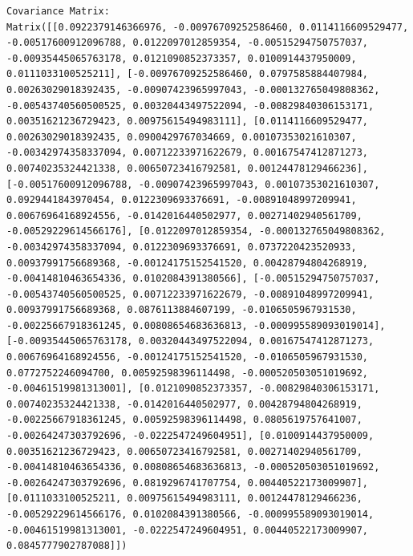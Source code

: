 \documentclass[
  letterpaper,
  DIV=11,
  numbers=noendperiod]{scrreprt}
\theoremstyle{plain}
\theoremstyle{definition}
\theoremstyle{remark}
\begin{document}
\begin{verbatim}
Covariance Matrix:
Matrix([[0.0922379146366976, -0.00976709252586460, 0.0114116609529477, -0.00517600912096788, 0.0122097012859354, -0.00515294750757037, -0.00935445065763178, 0.0121090852373357, 0.0100914437950009, 0.0111033100525211], [-0.00976709252586460, 0.0797585884407984, 0.00263029018392435, -0.00907423965997043, -0.000132765049808362, -0.00543740560500525, 0.00320443497522094, -0.00829840306153171, 0.00351621236729423, 0.00975615494983111], [0.0114116609529477, 0.00263029018392435, 0.0900429767034669, 0.00107353021610307, -0.00342974358337094, 0.00712233971622679, 0.00167547412871273, 0.00740235324421338, 0.00650723416792581, 0.00124478129466236], [-0.00517600912096788, -0.00907423965997043, 0.00107353021610307, 0.0929441843970454, 0.0122309693376691, -0.00891048997209941, 0.00676964168924556, -0.0142016440502977, 0.00271402940561709, -0.00529229614566176], [0.0122097012859354, -0.000132765049808362, -0.00342974358337094, 0.0122309693376691, 0.0737220423520933, 0.00937991756689368, -0.00124175152541520, 0.00428794804268919, -0.00414810463654336, 0.0102084391380566], [-0.00515294750757037, -0.00543740560500525, 0.00712233971622679, -0.00891048997209941, 0.00937991756689368, 0.0876113884607199, -0.0106505967931530, -0.00225667918361245, 0.00808654683636813, -0.000995589093019014], [-0.00935445065763178, 0.00320443497522094, 0.00167547412871273, 0.00676964168924556, -0.00124175152541520, -0.0106505967931530, 0.0772752246094700, 0.00592598396114498, -0.000520503051019692, -0.00461519981313001], [0.0121090852373357, -0.00829840306153171, 0.00740235324421338, -0.0142016440502977, 0.00428794804268919, -0.00225667918361245, 0.00592598396114498, 0.0805619757641007, -0.00264247303792696, -0.0222547249604951], [0.0100914437950009, 0.00351621236729423, 0.00650723416792581, 0.00271402940561709, -0.00414810463654336, 0.00808654683636813, -0.000520503051019692, -0.00264247303792696, 0.0819296741707754, 0.00440522173009907], [0.0111033100525211, 0.00975615494983111, 0.00124478129466236, -0.00529229614566176, 0.0102084391380566, -0.000995589093019014, -0.00461519981313001, -0.0222547249604951, 0.00440522173009907, 0.0845777902787088]])


\end{verbatim}
\end{document}
